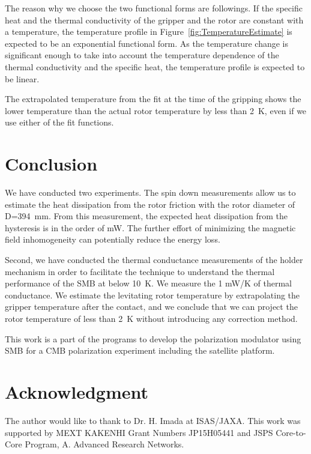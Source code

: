 \documentclass[journal]{IEEEtran}
\begin{document}
The reason why we choose the two functional forms are followings.
If the specific heat and the thermal conductivity of the gripper and the rotor are constant with a temperature, the temperature profile in Figure~\ref{fig:TemperatureEstimate} is expected to be an exponential functional form.
As the temperature change is significant enough to take into account the temperature dependence of the thermal conductivity and the specific heat, the temperature profile is expected to be linear. 

The extrapolated temperature from the fit at the time of the gripping shows the lower temperature than the actual rotor temperature by less than 2~K, even if we use either of the fit functions.

\section{Conclusion}
We have conducted two experiments.
The spin down measurements allow us to estimate the heat dissipation from the rotor friction with the rotor diameter of D=394~mm.
From this measurement, the expected heat dissipation from the hysteresis is in the order of mW.
The further effort of minimizing the magnetic field inhomogeneity can potentially reduce the energy loss.

Second, we have conducted the thermal conductance measurements of the holder mechanism in order to facilitate the technique to understand the thermal performance of the SMB at below 10~K.
We measure the 1 mW/K of thermal conductance.
We estimate the levitating rotor temperature by extrapolating the gripper temperature after the contact, and we conclude that we can project the rotor temperature of less than 2~K without introducing any correction method.

This work is a part of the programs to develop the polarization modulator using SMB for a CMB polarization experiment including the satellite platform.


\section*{Acknowledgment}
The author would like to thank to Dr. H. Imada at ISAS/JAXA. This work was supported by MEXT KAKENHI Grant Numbers JP15H05441 and JSPS Core-to-Core Program, A. Advanced Research Networks.
\end{document}
